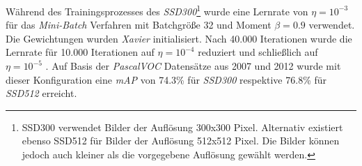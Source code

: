 Während des Trainingsprozesses des \textit{SSD300}\footnote{SSD300 verwendet Bilder der Auflösung 300x300 Pixel. Alternativ existiert ebenso SSD512 für Bilder der Auflösung 512x512 Pixel. Die Bilder können jedoch auch kleiner als die vorgegebene Auflösung gewählt werden.} wurde eine Lernrate von $\eta = 10^{-3}$ für das \textit{Mini-Batch} Verfahren mit Batchgröße 32 und Moment $\beta = 0.9$ verwendet. Die Gewichtungen wurden \textit{Xavier} initialisiert. Nach 40.000 Iterationen wurde die Lernrate für 10.000 Iterationen auf $\eta = 10^{-4}$ reduziert und schließlich auf $\eta = 10^{-5}$ \cite{ssd.20161229}. Auf Basis der \textit{PascalVOC} Datensätze aus 2007 und 2012 wurde mit dieser Konfiguration eine \textit{mAP} von 74.3\% für \textit{SSD300} respektive 76.8\% für \textit{SSD512} erreicht.
